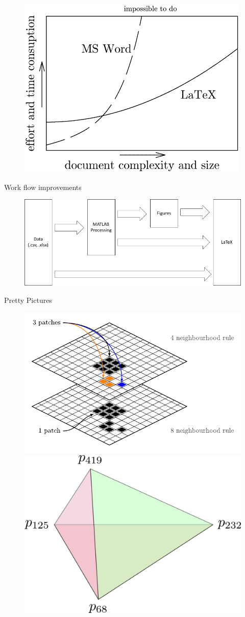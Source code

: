 
\begin{frame}{\insertsection}
	\begin{figure}
		\includegraphics[scale=0.5]{./Images/latex-difficulty-2.png}
	\end{figure}
\end{frame}

\begin{frame}{\insertsection}{Work flow improvements}
	\begin{figure}
		\includegraphics[width=0.7\linewidth]{./Images/workflow.pdf}
	\end{figure}
\end{frame}

\begin{frame}{\insertsection}{Pretty Pictures}
	\begin{figure}
		\includegraphics[width=0.35\linewidth]{./Images/Neighbourhood_definition2.pdf}
		\hspace{5em}
		\includegraphics[width=0.35\linewidth]{./Images/nicePic.png}
	\end{figure}
\end{frame}

